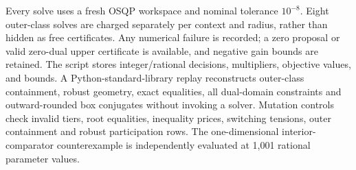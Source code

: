 \documentclass[11pt,letterpaper]{article}
\theoremstyle{definition}
\newcommand{\1}{\mathbf 1}
\begin{document}
Every solve uses a fresh OSQP workspace and nominal tolerance $10^{-8}$. Eight outer-class solves are charged separately per context and radius, rather than hidden as free certificates. Any numerical failure is recorded; a zero proposal or valid zero-dual upper certificate is available, and negative gain bounds are retained. The script stores integer/rational decisions, multipliers, objective values, and bounds. A Python-standard-library replay reconstructs outer-class containment, robust geometry, exact equalities, all dual-domain constraints and outward-rounded box conjugates without invoking a solver. Mutation controls check invalid tiers, root equalities, inequality prices, switching tensions, outer containment and robust participation rows. The one-dimensional interior-comparator counterexample is independently evaluated at 1,001 rational parameter values.
\end{document}
